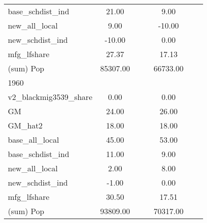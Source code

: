 \begin{table}[htbp]
\begin{tabular}{l*{2}{ccc}}
base\_schdist\_ind    &       21.00&            &            &        9.00&            &            \\
new\_all\_local       &        9.00&            &            &      -10.00&            &            \\
new\_schdist\_ind     &      -10.00&            &            &        0.00&            &            \\
mfg\_lfshare         &       27.37&            &            &       17.13&            &            \\
(sum) Pop           &    85307.00&            &            &    66733.00&            &            \\
\midrule
1960                &            &            &            &            &            &            \\
v2\_blackmig3539\_share&        0.00&            &            &        0.00&            &            \\
GM                  &       24.00&            &            &       26.00&            &            \\
GM\_hat2             &       18.00&            &            &       18.00&            &            \\
base\_all\_local      &       45.00&            &            &       53.00&            &            \\
base\_schdist\_ind    &       11.00&            &            &        9.00&            &            \\
new\_all\_local       &        2.00&            &            &        8.00&            &            \\
new\_schdist\_ind     &       -1.00&            &            &        0.00&            &            \\
mfg\_lfshare         &       30.50&            &            &       17.51&            &            \\
(sum) Pop           &    93809.00&            &            &    70317.00&            &            \\
\bottomrule
\end{tabular}
\end{table}
